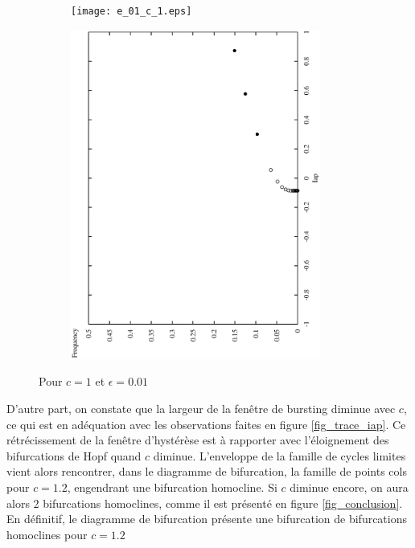 \documentclass[12pt,a4paper,onecolumn]{article}
\begin{document}
\begin{figure}[htb]\ContinuedFloat
	\centering
	\begin{subfigure}[b]{\textwidth}
		\texttt{[image: e\_01\_c\_1.eps]}
	\end{subfigure}

	\begin{subfigure}[b]{\textwidth}
		\includegraphics[angle = 270, width = 0.9\textwidth]{freq_c_1.eps}
	\end{subfigure}
	\caption{Pour $c = 1$ et $\epsilon = 0.01$}
\label{fig_transition}
\end{figure}



D'autre part, on constate que la largeur de la fenêtre de bursting diminue avec $c$, ce qui est en adéquation avec les observations faites en figure \ref{fig_trace_iap}. Ce rétrécissement de la fenêtre d'hystérèse est à rapporter avec l'éloignement des bifurcations de Hopf quand $c$ diminue. L'enveloppe de la famille de cycles limites vient alors rencontrer, dans le diagramme de bifurcation, la famille de points cols pour $c=1.2$, engendrant une bifurcation homocline. Si $c$ diminue encore, on aura alors 2 bifurcations homoclines, comme il est présenté en figure \ref{fig_conclusion}.
En définitif, le diagramme de bifurcation présente une bifurcation de bifurcations homoclines pour $c=1.2$
\end{document}
